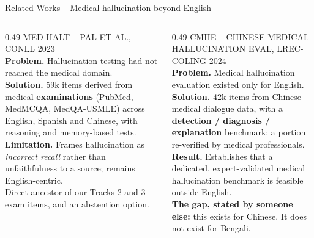 \documentclass[aspectratio=169,11pt]{beamer}
\newcommand{\eyebrow}[1]{{\scriptsize\color{soft}\MakeUppercase{#1}}\\[1mm]}
\begin{document}
\begin{frame}{Related Works \;--\; Medical hallucination beyond English}
\vspace{-2mm}
{\footnotesize
\begin{columns}[T]
\begin{column}{0.49\textwidth}
\eyebrow{Med-HALT \;--\; Pal et al., CoNLL 2023}
\textbf{Problem.} Hallucination testing had not reached the medical domain.\\[1mm]
\textbf{Solution.} 59k items derived from medical \textbf{examinations} (PubMed, MedMCQA, MedQA-USMLE) across English, Spanish and Chinese, with reasoning and memory-based tests.\\[1mm]
\textbf{Limitation.} Frames hallucination as \emph{incorrect recall} rather than unfaithfulness to a source; remains English-centric.\\[2mm]
{\color{soft}Direct ancestor of our Tracks 2 and 3 -- exam items, and an abstention option.}
\end{column}
\begin{column}{0.49\textwidth}
\eyebrow{CMHE \;--\; Chinese Medical Hallucination Eval, LREC-COLING 2024}
\textbf{Problem.} Medical hallucination evaluation existed only for English.\\[1mm]
\textbf{Solution.} 42k items from Chinese medical dialogue data, with a \textbf{detection / diagnosis / explanation} benchmark; a portion re-verified by medical professionals.\\[1mm]
\textbf{Result.} Establishes that a dedicated, expert-validated medical hallucination benchmark is feasible outside English.\\[2mm]
{\color{bad}\textbf{The gap, stated by someone else:} this exists for Chinese. It does not exist for Bengali.}
\end{column}
\end{columns}
}
\end{frame}
\end{document}
